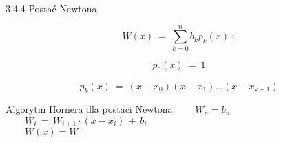     \begin{frame}{3.4.4 Postać Newtona}
    \begin{block}{}
	$$W(x)\ =\ \sum_{k=0}^{n}b_{k}p_{k}(x)\ ;$$
	\end{block}
	$$p_{0}(x)\ =\ 1$$

	$$p_{k}(x)\ =\ (x-x_{0})(x-x_{1})\ldots(x-x_{k-1})$$

    \end{frame}
\begin{frame}{Algorytm Hornera dla postaci Newtona }
   $\qquad W_n = b_n$\\
	$\qquad W_i\, = \,W_{i+1}\cdot (x-x_i)\,+\,b_i$\\
	$\qquad W(x)=W_{0}$ \\
\end{frame}